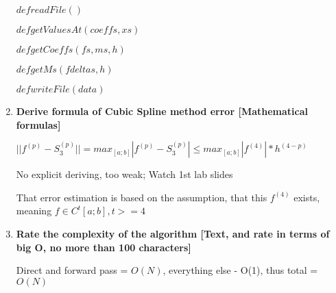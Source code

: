 \documentclass{article}
\begin{document}
\begin{enumerate}
    $ def readFile()$
    
    $ def getValuesAt(coeffs, xs)$
    
    $ def getCoeffs(fs, ms, h)$
    
    $ def getMs(fdeltas, h)$
    
    $ def writeFile(data)$
    

    \item \textbf{Derive formula of Cubic Spline method error [Mathematical formulas]}
    
    $|| f^{(p)} - S^{(p)}_3 || = max_{[a;b]}|f^{(p)} - S^{(p)}_3| \le max_{[a;b]}|f^{(4)}|*h^{(4-p)}$ 
    
    No explicit deriving, too weak; Watch 1st lab slides
    
    
    That error estimation is based on the assumption, that this $f^{(4)}$ exists, meaning $f \in C^{t}[a;b], t>=4$
    
    
    \item \textbf{Rate the complexity of the algorithm [Text, and rate in terms of big O, no more than 100 characters]}
    
    Direct and forward pass = $O(N)$, everything else - O(1), thus total = $O(N)$

\end{enumerate}
\end{document}
